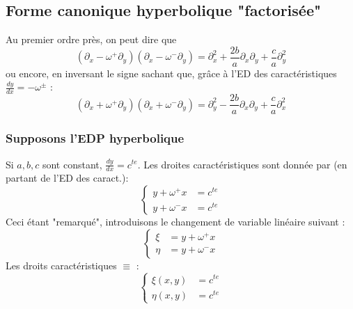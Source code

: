 \documentclass[british,french,11pt, a4paper, openany]{book}
\begin{document}
			\subsection{Forme canonique hyperbolique "factorisée"}
			Au premier ordre près, on peut dire que
			\begin{equation}
				(\partial_x - \omega^+ \partial_y)(\partial_x - \omega^- \partial_y) = \partial_x^2 + \frac{2b}{a}\partial_x\partial_y + \frac{c}{a}\partial_y^2
			\end{equation}
			ou encore, en inversant le signe sachant que, grâce à l'ED des caractéristiques $\frac{dy}{dx} = -\omega^\pm$ :
			\begin{equation}
				(\partial_x + \omega^+ \partial_y)(\partial_x + \omega^- \partial_y) = \partial_y^2 - \frac{2b}{a}\partial_x\partial_y + \frac{c}{a}\partial_x^2
			\end{equation}
																
			\subsubsection{Supposons l'EDP hyperbolique}
			Si $a,b,c$ sont constant, $\frac{dy}{dx} = c^{te}$. Les droites caractéristiques sont donnée par (en partant de l'ED des caract.):
			\begin{equation}
				\left\{\begin{array}{ll}
				y+\omega^+x &= c^{te}\\
				y+\omega^-x &= c^{te}
				\end{array}\right.
			\end{equation}
			Ceci étant "remarqué", introduisons le changement de variable linéaire suivant :
			\begin{equation}
				\left\{\begin{array}{ll}
				\xi &= y +\omega^+x\\
				\eta &= y +\omega^-x
				\end{array}\right.
			\end{equation}
			Les droits caractéristiques $\equiv$ :
			\begin{equation}
				\left\{\begin{array}{ll}
				\xi(x,y) &= c^{te}\\
				\eta(x,y) &= c^{te}
				\end{array}\right.
			\end{equation}
			\ \\
																
\end{document}
